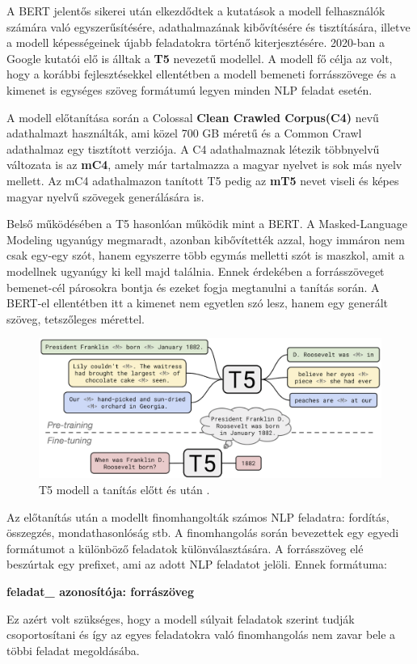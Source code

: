 A BERT jelentős sikerei után elkezdődtek a kutatások a modell felhasználók számára való egyszerűsítésére, adathalmazának kibővítésére és tisztítására, illetve a modell képességeinek újabb feladatokra történő kiterjesztésére. 2020-ban a Google kutatói elő is álltak a \textbf{T5} nevezetű modellel. A modell fő célja az volt, hogy a korábbi fejlesztésekkel ellentétben a modell bemeneti forrásszövege és a kimenet is egységes szöveg formátumú legyen minden NLP feladat esetén.

A modell előtanítása során a Colossal \textbf{Clean Crawled Corpus(C4)} nevű adathalmazt használták, ami közel 700 GB méretű és a  Common Crawl adathalmaz egy tisztított verziója. A C4 adathalmaznak létezik többnyelvű változata is az \textbf{mC4}, amely már tartalmazza a magyar nyelvet is sok más nyelv mellett. Az mC4 adathalmazon tanított T5 pedig az \textbf{mT5} nevet viseli és képes magyar nyelvű szövegek generálására is.

Belső működésében a T5 hasonlóan működik mint a BERT. A Masked-Language Modeling ugyanúgy megmaradt, azonban kibővítették azzal, hogy immáron nem csak egy-egy szót, hanem egyszerre több egymás melletti szót is maszkol, amit a modellnek ugyanúgy ki kell majd találnia. Ennek érdekében a forrásszöveget bemenet-cél párosokra bontja és ezeket fogja megtanulni a tanítás során. A BERT-el ellentétben itt a kimenet nem egyetlen szó lesz, hanem egy generált szöveg, tetszőleges mérettel.

\newpage

\begin{figure}[h]
\centering
\includegraphics[scale=0.2]{images/t5.png}
\caption{T5 modell a tanítás előtt és után \cite{t5}.}
\label{fig:t5}
\end{figure}

Az előtanítás után a modellt finomhangolták számos NLP feladatra: fordítás,\\
összegzés, mondathasonlóság stb. A finomhangolás során bevezettek egy egyedi formátumot a különböző feladatok különválasztására. A forrásszöveg elé beszúrtak egy prefixet, ami az adott NLP feladatot jelöli. Ennek formátuma:

\textbf{feladat\_ azonosítója: forrászöveg}

Ez azért volt szükséges, hogy a modell súlyait feladatok szerint tudják csoportosítani és így az egyes feladatokra való finomhangolás nem zavar bele a többi feladat megoldásába.